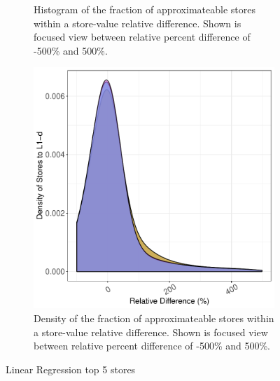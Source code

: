 \begin{figure}[htbp]
\begin{subfigure}{0.33\textwidth}
		\caption{Histogram of the fraction of approximateable stores within a store-value relative difference. Shown is focused view between relative percent difference of -500\% and 500\%.}
	\end{subfigure}
	\begin{subfigure}{0.33\textwidth}
		\centering
		\includegraphics[scale=0.4]{graphs/linear_regression_top5/narrow_dist.pdf}
		\caption{Density of the fraction of approximateable stores within a store-value relative difference. Shown is focused view between relative percent difference of -500\% and 500\%.}
	\end{subfigure}
\caption{Linear Regression top 5 stores} %
\label{fig:linear_regression_valsim_top5}
\end{figure}




